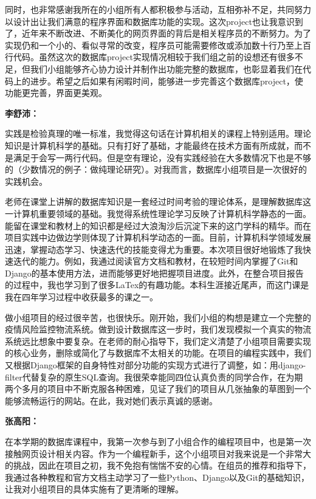 \documentclass[12pt]{article}
\begin{document}
同时，也非常感谢我所在的小组所有人都积极参与活动，互相弥补不足，共同努力以设计出让我们满意的程序界面和数据库功能的实现。这次project也让我意识到了，近年来不断改进、不断美化的网页界面的背后是相关程序员的不断努力。为了实现仍和一个小的、看似寻常的改变，程序员可能需要修改或添加数十行乃至上百行代码。虽然这次的数据库project实现情况相较于我们组之前的设想还有很多不足，但我们小组能够齐心协力设计并制作出功能完整的数据库，也彰显着我们在代码上的进步。希望之后如果有闲暇时间，能够进一步完善这个数据库project，使功能更完善，界面更美观。

\vspace{0.3cm}
\noindent\textbf{李舒沛：}\par
实践是检验真理的唯一标准，我觉得这句话在计算机相关的课程上特别适用。理论知识是计算机科学的基础。只有打好了基础，才能最终在技术方面有所成就，而不是满足于会写一两行代码。但是空有理论，没有实践经验在大多数情况下也是不够的（少数情况的例子：做纯理论研究）。对我而言，数据库小组项目是一次很好的实践机会。

老师在课堂上讲解的数据库知识是一套经过时间考验的理论体系，是理解数据库这一计算机重要领域的基础。我觉得系统性理论学习反映了计算机科学静态的一面。能留在课堂和教材上的知识都是经过大浪淘沙后沉淀下来的这门学科的精华。而在项目实践中边做边学则体现了计算机科学动态的一面。目前，计算机科学领域发展迅速，掌握动态学习、快速迭代的技能变得尤为重要。本次项目很好地锻炼了我快速迭代的能力。例如，我通过阅读官方文档和教材，在较短时间内掌握了Git和Django的基本使用方法，进而能够更好地把握项目进度。此外，在整合项目报告的过程中，我也学习到了很多LaTex的有趣功能。本科生涯接近尾声，而这门课是我在四年学习过程中收获最多的课之一。

做小组项目的经过很辛苦，也很快乐。刚开始，我们小组的构想是建立一个完整的疫情风险监控物流系统。做到设计数据库这一步时，我们发现模拟一个真实的物流系统远比想象中要复杂。在老师的耐心指导下，我们定义清楚了小组项目需要实现的核心业务，删除或简化了与数据库不太相关的功能。在项目的编程实践中，我们又根据Django框架的自身特性对部分功能的实现方式进行了调整，如：用django-filter代替复杂的原生SQL查询。我很荣幸能同四位认真负责的同学合作，在为期两个多月的项目中不断克服各种困难，见证了我们的项目从几张抽象的草图到一个能够流畅运行的网站。在此，我对她们表示真诚的感谢。

\vspace{0.3cm}
\noindent\textbf{张高阳：}\par
在本学期的数据库课程中，我第一次参与到了小组合作的编程项目中，也是第一次接触网页设计相关内容。作为一个编程新手，这个小组项目对我来说是一个非常大的挑战，因此在项目之初，我不免抱有惴惴不安的心情。在组员的推荐和指导下，我通过各种教程和官方文档主动学习了一些Python、Django以及Git的基础知识，让我对小组项目的具体实施有了更清晰的理解。
\end{document}
